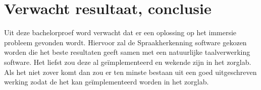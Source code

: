 %
%
%
%
%

\section{Verwacht resultaat, conclusie}%
\label{sec:verwachte_resultaten}

Uit deze bachelorproef word verwacht dat er een oplossing op het immersie probleem gevonden wordt. Hiervoor zal de Spraakherkenning software gekozen worden die het beste resultaten geeft samen met een natuurlijke taalverwerking software. Het liefst zou deze al geïmplementeerd en wekende zijn in het zorglab. Als het niet zover komt dan zou er ten minste bestaan uit een goed uitgeschreven werking zodat de het kan geïmplementeerd worden in het zorglab.

%
%

